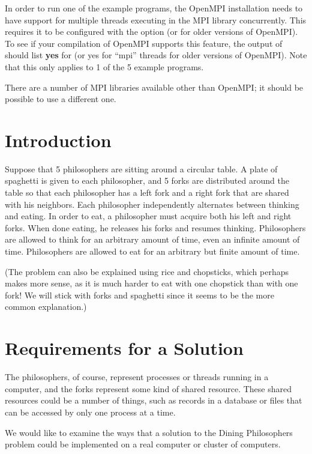 \documentclass[letterpaper,10pt,openany,oneside]{sphinxmanual}
\begin{document}
In order to run one of the example programs, the OpenMPI
installation needs to have support for multiple threads executing
in the MPI library concurrently. This requires it to be configured
with the  option (or
 for older versions of OpenMPI). To see if
your compilation of OpenMPI supports this feature, the output of
 should list \textbf{yes} for
 (or yes for ``mpi'' threads for older
versions of OpenMPI). Note that this only applies to 1 of the 5
example programs.

There are a number of MPI libraries available other than OpenMPI;
it should be possible to use a different one.


\section{Introduction}
\label{Introduction/Introduction:id1}
Suppose that 5 philosophers are sitting around a circular table. A
plate of spaghetti is given to each philosopher, and 5 forks are
distributed around the table so that each philosopher has a left
fork and a right fork that are shared with his neighbors. Each
philosopher independently alternates between thinking and eating.
In order to eat, a philosopher must acquire both his left and right
forks. When done eating, he releases his forks and resumes
thinking. Philosophers are allowed to think for an arbitrary amount
of time, even an infinite amount of time. Philosophers are allowed
to eat for an arbitrary but finite amount of time.

(The problem can also be explained using rice and chopsticks, which
perhaps makes more sense, as it is much harder to eat with one
chopstick than with one fork! We will stick with forks and
spaghetti since it seems to be the more common explanation.)


\section{Requirements for a Solution}
\label{Introduction/Introduction:requirements-for-a-solution}
The philosophers, of course, represent processes or threads running
in a computer, and the forks represent some kind of shared
resource. These shared resources could be a number of things, such
as records in a database or files that can be accessed by only one
process at a time.

We would like to examine the ways that a solution to the Dining
Philosophers problem could be implemented on a real computer or
cluster of computers.
\end{document}
